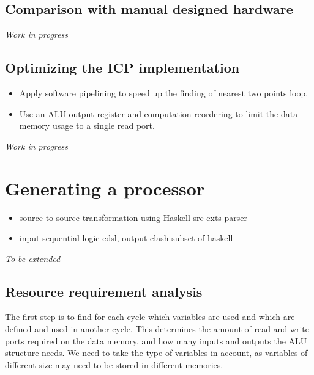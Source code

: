 \documentclass[preprint]{sigplanconf}
\def\codefamily{\sffamily\normalsize}
\begin{document}
\lstset{basicstyle=\codefamily}

\subsection{Comparison with manual designed hardware}

\textit{Work in progress}

\subsection{Optimizing the ICP implementation}
\begin{itemize}
  \item Apply software pipelining to speed up the finding of nearest two points loop.
  \item Use an ALU output register and computation reordering to limit the data memory usage to a single read port.
\end{itemize}  

\textit{Work in progress}


\section{Generating a processor}
\begin{itemize}
  \item source to source transformation using Haskell-src-exts parser
  \item input sequential logic edsl, output clash subset of haskell
\end{itemize}

\textit{To be extended}

\subsection{Resource requirement analysis}
The first step is to find for each cycle which variables are used and which are defined and used in another cycle.
This determines the amount of read and write ports required on the data memory, and how many inputs and outputs the ALU structure needs.
We need to take the type of variables in account, as variables of different size may need to be stored in different memories. \\
\end{document}
